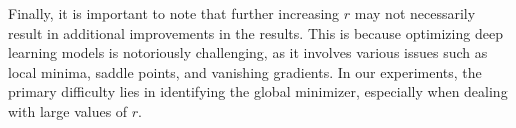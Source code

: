\documentclass[nohyperref]{article}
\theoremstyle{plain}
\theoremstyle{definition}
\theoremstyle{remark}
\begin{document}
Finally, it is important to note that further increasing $r$ may not necessarily result in additional improvements in the results. This is because optimizing deep learning models is notoriously challenging, as it involves various issues such as local minima, saddle points, and vanishing gradients. In our experiments, the primary difficulty lies in identifying the global minimizer, especially when dealing with large values of $r$. 


\begin{table}[ht]%
	\caption{Test accuracy comparison.} 
	\label{tab:accuracy:comparison}	
	\centering  
\end{table} 
\end{document}
